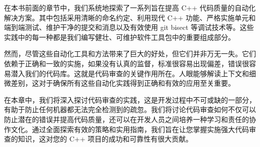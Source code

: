 在本书前面的章节中，我们系统地探索了一系列旨在提高 C++ 代码质量的自动化解决方案。其中包括采用清晰的命名约定、利用现代 C++ 功能、严格实施单元和端到端测试、维护干净的提交和消息以及有效使用 git bisect 等调试技术等。这些实践中的每一种都是我们编写健壮、可维护软件工具包中的重要组成部分。

然而，尽管这些自动化工具和方法带来了巨大的好处，但它们并非万无一失。它们依赖于正确和一致的实施，如果没有认真的监督，标准很容易出现偏差，错误很容易潜入我们的代码库。这就是代码审查的关键作用所在。人眼能够解读上下文和细微差别，这对于确保所有这些自动化实践得到正确和有效的应用至关重要。

在本章中，我们将深入探讨代码审查的实践，这是开发过程中不可或缺的一部分，有助于防止任何机器都无法完全检测到的疏忽。我们将讨论代码审查如何不仅可以防止潜在的错误并提高代码质量，还可以在开发人员之间培养一种学习和责任的协作文化。通过全面探索有效的策略和实用指南，我们旨在让您掌握实施强大代码审查的知识，这对您的 C++ 项目的成功和可靠性有很大贡献。